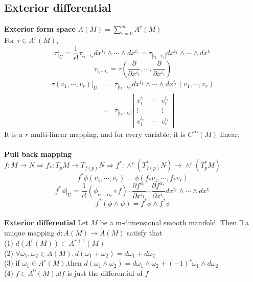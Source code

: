 \documentclass{article}
\begin{document}
\subsection{Exterior differential}
\textbf{Exterior form space} $A(M) = \sum_{r=0}^{m} A^{r}(M)$\\
For $\tau \in A^r(M)$,
\[\tau|_{U} = \frac{1}{r!} \tau_{i_1\cdots i_r} dx^{i_1} \wedge \cdots \wedge dx^{i_r} = \tau_{|i_1\cdots i_r|} dx^{i_1} \wedge \cdots \wedge dx^{i_r}\] 
\[ \tau_{i_1\cdots i_r} = \tau(\frac{\partial}{\partial x^{i_1}},\cdots,\frac{\partial}{\partial x^{i_r}}) \]
\begin{eqnarray}
\tau(v_1,\cdots,v_r)|_{U} &=& \tau_{|i_1\cdots i_r|}dx^{i_1} \wedge \cdots \wedge dx^{i_r} (v_1,\cdots,v_r) \nonumber \\
&=& \tau_{|i_1\cdots i_r|} \left| \begin{matrix} v_1^{i_1}& \cdots & v_r^{i_1}\\ \vdots & & \vdots \\ v_1^{i_r} & \cdots & v_r^{i_r} \end{matrix} \right| \nonumber
\end{eqnarray}
It is a $r$ multi-linear mapping, and for every variable, it is $C^{\infty}(M)$ linear.\\ \\
\textbf{Pull back mapping}\\
$f:M \to N \Rightarrow f_{*}:T_{p}M \to T_{f(p)}N \Rightarrow f^{*}:\wedge^{r}(T_{f(p)}^{*}N) \to \wedge^{r}(T_p^*M) $\\
\[f^* \phi(v_1,\cdots,v_r) = \phi(f_*v_1,\cdots,f_*v_r)\]
\[f^*\phi|_U = \frac{1}{r!}(\phi_{\alpha_1\cdots\alpha_r} \circ f) \cdot \frac{\partial f^{\alpha_1}}{\partial x^{i_1}} \cdots \frac{\partial f^{\alpha_r}}{\partial x^{i_r}} dx^{i_1} \wedge \cdots \wedge dx^{i_r}\]
\[f^*(\phi \wedge \psi) = f^*\phi \wedge f^* \psi\]\\
\textbf{Exterior differential} Let $M$ be a m-dimensional smooth manifold. Then $\exists$ a unique mapping $d:A(M) \to A(M)$ satisfy that\\
(1) $d(A^r(M)) \subset A^{r+1}(M)$\\
(2) $\forall \omega_1,\omega_2 \in A(M),d(\omega_1+\omega_2) = d\omega_1 +d\omega_2$\\
(3) if $\omega_1 \in A^r(M)$,then $d(\omega_1 \wedge \omega_2)=d\omega_1 \wedge \omega_2 +(-1)^r \omega_1 \wedge d\omega_2$\\
(4) $f \in A^0(M)$,$df$ is just the differential of $f$\\
\end{document}
